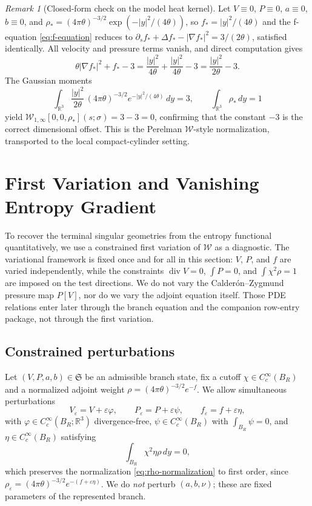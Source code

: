 \documentclass[11pt]{amsart}
\numberwithin{equation}{section}
\theoremstyle{plain}
\theoremstyle{definition}
\theoremstyle{remark}
\newtheorem{remark}[theorem]{Remark}
\newcommand{\R}{\mathbb R}
\newcommand{\Wloc}{\mathcal W}
\newcommand{\State}{\mathfrak S}
\newcommand{\diver}{\operatorname{div}}
\begin{document}
\begin{remark}[Closed-form check on the model heat kernel]
\label{rem:heat-kernel-check}
Let \(V\equiv0\), \(P\equiv0\), \(a\equiv0\), \(b\equiv0\), and
\(\rho_*=(4\pi\theta)^{-3/2}\exp(-|y|^2/(4\theta))\), so
\(f_*=|y|^2/(4\theta)\) and the f-equation \eqref{eq:f-equation} reduces to
\(\partial_s f_*+\Delta f_*-|\nabla f_*|^2=3/(2\theta)\), satisfied
identically.  All velocity and pressure terms vanish, and direct
computation gives
\[
	\theta|\nabla f_*|^2+f_*-3
	=\frac{|y|^2}{4\theta}+\frac{|y|^2}{4\theta}-3
	=\frac{|y|^2}{2\theta}-3.
\]
The Gaussian moments
\[
	\int_{\R^3}\frac{|y|^2}{2\theta}\,
	(4\pi\theta)^{-3/2}e^{-|y|^2/(4\theta)}\,dy=3,
	\qquad
	\int_{\R^3}\rho_*\,dy=1
\]
yield \(\Wloc_{1,\infty}[0,0,\rho_*](s;\sigma)=3-3=0\), confirming that the
constant \(-3\) is the correct dimensional offset.  This is the Perelman
\(\mathcal W\)-style normalization, transported to the local
compact-cylinder setting.
\end{remark}

\section{First Variation and Vanishing Entropy Gradient}
\label{sec:gradient}

To recover the terminal singular geometries from the entropy functional
quantitatively, we use a constrained first variation of \(\Wloc\) as a
diagnostic.  The variational framework is fixed once and for all in this
section: \(V\), \(P\), and \(f\) are varied independently, while the
constraints \(\diver V=0\), \(\int P=0\), and
\(\int\chi^2\rho=1\) are imposed on the test directions.  We do not vary
the Calder\'on--Zygmund pressure map \(P[V]\), nor do we vary the adjoint
equation itself.  Those PDE relations enter later through the branch
equation and the companion row-entry package, not through the first
variation.

\subsection{Constrained perturbations}

Let \((V,P,a,b)\in\State\) be an admissible branch state, fix a cutoff
\(\chi\in C_c^\infty(B_R)\) and a normalized adjoint weight
\(\rho=(4\pi\theta)^{-3/2}e^{-f}\).  We allow simultaneous perturbations
\begin{equation}\label{eq:perturbations}
	V_\varepsilon=V+\varepsilon\varphi,\qquad
	P_\varepsilon=P+\varepsilon\psi,\qquad
	f_\varepsilon=f+\varepsilon\eta,
\end{equation}
with \(\varphi\in C_c^\infty(B_R;\R^3)\) divergence-free,
\(\psi\in C_c^\infty(B_R)\) with \(\int_{B_R}\psi=0\), and
\(\eta\in C_c^\infty(B_R)\) satisfying
\begin{equation}\label{eq:eta-constraint}
	\int_{B_R}\chi^2\eta\rho\,dy=0,
\end{equation}
which preserves the normalization \eqref{eq:rho-normalization} to first
order, since \(\rho_\varepsilon=(4\pi\theta)^{-3/2}e^{-(f+\varepsilon\eta)}\).
We do \emph{not} perturb \((a,b,\nu)\); these are fixed parameters of the
represented branch.
\end{document}
